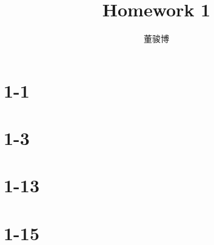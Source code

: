 \documentclass[onecolumn,oneside]{SUSTechHomework}
\author{董骏博}
\title{Homework 1}
\begin{document}
  \maketitle
  
  \section*{1-1}
  
  \section*{1-3}
  
  \section*{1-13}
  
  \section*{1-15}
  
  
\end{document}
